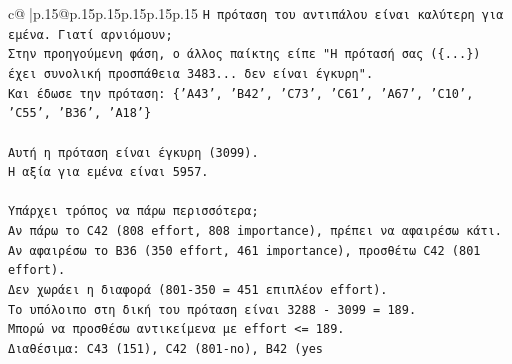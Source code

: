 \documentclass{article}
\begin{document}
{\begin{supertabular}{c@{$\;$}|p{.15\linewidth}@{}p{.15\linewidth}p{.15\linewidth}p{.15\linewidth}p{.15\linewidth}p{.15\linewidth}}
{{{\texttt{Η πρόταση του αντιπάλου είναι καλύτερη για εμένα. Γιατί αρνιόμουν;} \\
\texttt{Στην προηγούμενη φάση, ο άλλος παίκτης είπε "Η πρότασή σας (\{...\}) έχει συνολική προσπάθεια 3483... δεν είναι έγκυρη".} \\
\texttt{Και έδωσε την πρόταση: \{'A43', 'B42', 'C73', 'C61', 'A67', 'C10', 'C55', 'B36', 'A18'\}} \\
\\ 
\texttt{Αυτή η πρόταση είναι έγκυρη (3099).} \\
\texttt{Η αξία για εμένα είναι 5957.} \\
\\ 
\texttt{Υπάρχει τρόπος να πάρω περισσότερα;} \\
\texttt{Αν πάρω το C42 (808 effort, 808 importance), πρέπει να αφαιρέσω κάτι.} \\
\texttt{Αν αφαιρέσω το B36 (350 effort, 461 importance), προσθέτω C42 (801 effort).} \\
\texttt{Δεν χωράει η διαφορά (801{-}350 = 451 επιπλέον effort).} \\
\texttt{Το υπόλοιπο στη δική του πρόταση είναι 3288 {-} 3099 = 189.} \\
\texttt{Μπορώ να προσθέσω αντικείμενα με effort <= 189.} \\
\texttt{Διαθέσιμα: C43 (151), C42 (801{-}no), B42 (yes} \\
            }
        }
    }
     \\ \\


\end{supertabular}}
\end{document}
